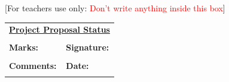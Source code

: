 \begin{titlepage}
\makeatother
{\large [For teachers use only: \textcolor{red}{Don’t write anything inside this box}]}\\

\begin{table}[]
\centering
\begin{tabular}{|p{7.5cm}p{7.0cm}|}
\hline
\multicolumn{2}{|c|}{{\underline{\textbf{Project Proposal Status}}}} \\
 & \\\hline
\textbf{Marks:}                & \textbf{Signature:}        \\
 & \\ 
\textbf{Comments:}             & \textbf{Date:}             \\ 
 & \\\hline
\end{tabular}
\end{table}


\end{titlepage}

